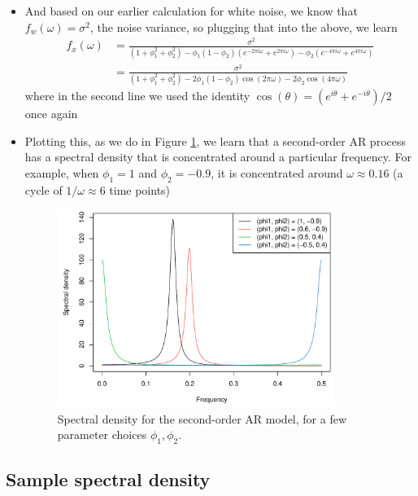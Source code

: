 \documentclass{article}
\begin{document}
\begin{itemize}
\item And based on our earlier calculation for white noise, we know that
  $f_w(\omega) = \sigma^2$, the noise variance, so plugging that into the above,
  we learn 
  \begin{align*}
  f_x(\omega) &= \frac{\sigma^2}{ (1+\phi_1^2+\phi_2^2)  
    - \phi_1(1-\phi_2) (e^{-2\pi i \omega} + e^{2\pi i \omega})
    - \phi_2 (e^{-4\pi i \omega} + e^{4\pi i \omega}) } \\
  &= \frac{\sigma^2}{ (1+\phi_1^2+\phi_2^2)  
    -2 \phi_1(1-\phi_2) \cos(2\pi \omega) 
    - 2 \phi_2 \cos(4\pi \omega) }
  \end{align*}
  where in the second line we used the identity $\cos(\theta) = (e^{i\theta}
  +e^{-i\theta}) / 2$ once again

\item Plotting this, as we do in Figure \ref{fig:spectral_density_ar}, we learn
  that a second-order AR process has a spectral density that is concentrated
  around a particular frequency. For example, when $\phi_1 = 1$ and $\phi_2 = 
  -0.9$, it is concentrated around $\omega \approx 0.16$ (a cycle of $1/\omega
  \approx 6$ time points)

\begin{figure}[htb]
\centering
\includegraphics[width=0.85\textwidth]{fig/spectral-density-ar-1.pdf}
\caption{Spectral density for the second-order AR model, for a few parameter
  choices $\phi_1,\phi_2$.}
\label{fig:spectral_density_ar}
\end{figure}
\end{itemize}

\subsection{Sample spectral density}
\end{document}
